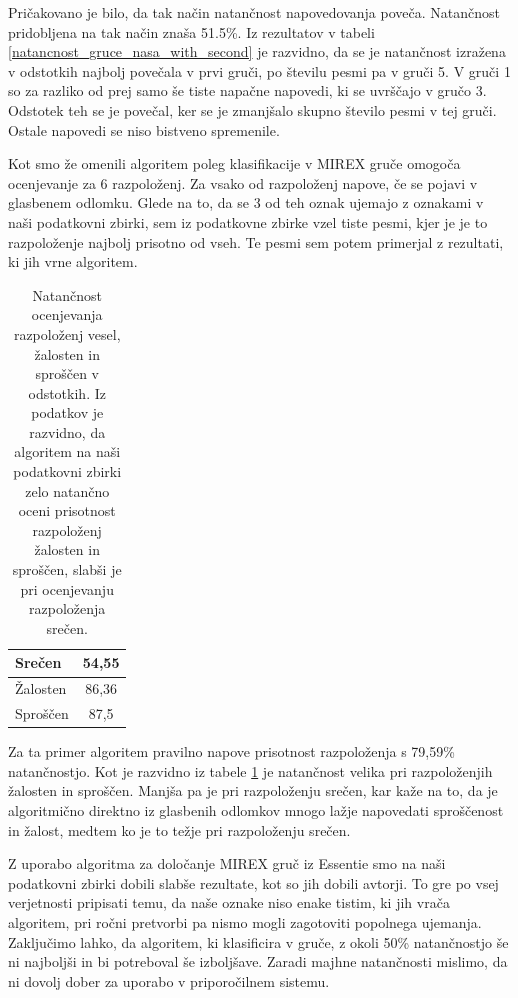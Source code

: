 \documentclass[a4paper, 12pt]{book}
\begin{document}
{Pričakovano je bilo, da tak način natančnost napovedovanja poveča. Natančnost pridobljena na tak način znaša 51.5\%. Iz rezultatov v tabeli \ref{natancnost_gruce_nasa_with_second} je razvidno, da se je natančnost izražena v odstotkih najbolj povečala v prvi gruči, po številu pesmi pa v gruči 5. V gruči 1 so za razliko od prej samo še tiste napačne napovedi, ki se uvrščajo v gručo 3. Odstotek teh se je povečal, ker se je zmanjšalo skupno število pesmi v tej gruči. Ostale napovedi se niso bistveno spremenile. 

Kot smo že omenili algoritem poleg klasifikacije v MIREX gruče omogoča ocenjevanje za 6 razpoloženj. Za vsako od razpoloženj napove, če se pojavi v glasbenem odlomku. Glede na to, da se 3 od teh oznak ujemajo z oznakami v naši podatkovni zbirki, sem iz podatkovne zbirke vzel tiste pesmi, kjer je je to razpoloženje najbolj prisotno od vseh. Te pesmi sem potem primerjal z rezultati, ki jih vrne algoritem. 

\begin{table}[htb]
\begin{center}
\caption{Natančnost ocenjevanja razpoloženj vesel, žalosten in sproščen v odstotkih. Iz podatkov je razvidno, da algoritem na naši podatkovni zbirki zelo natančno oceni prisotnost razpoloženj žalosten in sproščen, slabši je pri ocenjevanju razpoloženja srečen. }
\begin{tabular}{|l|c|}
\hline
Srečen & 54,55\\ \hline
Žalosten & 86,36\\ \hline
Sproščen & 87,5\\ \hline

\end{tabular}
\label{natancnost_es_custva}
\end{center}
\end{table}

Za ta primer algoritem pravilno napove prisotnost razpoloženja s 79,59\% natančnostjo. Kot je razvidno iz tabele \ref{natancnost_es_custva} je natančnost velika pri razpoloženjih žalosten in sproščen. Manjša pa je pri razpoloženju srečen, kar kaže na to, da je algoritmično direktno iz glasbenih odlomkov mnogo lažje napovedati sproščenost in žalost, medtem ko je to težje pri razpoloženju srečen. 

Z uporabo algoritma za določanje MIREX gruč iz Essentie smo na naši podatkovni zbirki dobili slabše rezultate, kot so jih dobili avtorji. To gre po vsej verjetnosti pripisati temu, da naše oznake niso enake tistim, ki jih vrača algoritem, pri ročni pretvorbi pa nismo mogli zagotoviti popolnega ujemanja. Zaključimo lahko, da algoritem, ki klasificira v gruče, z okoli 50\% natančnostjo še ni najboljši in bi potreboval še izboljšave. Zaradi majhne natančnosti mislimo, da ni dovolj dober za uporabo v priporočilnem sistemu. 

}
\end{document}
